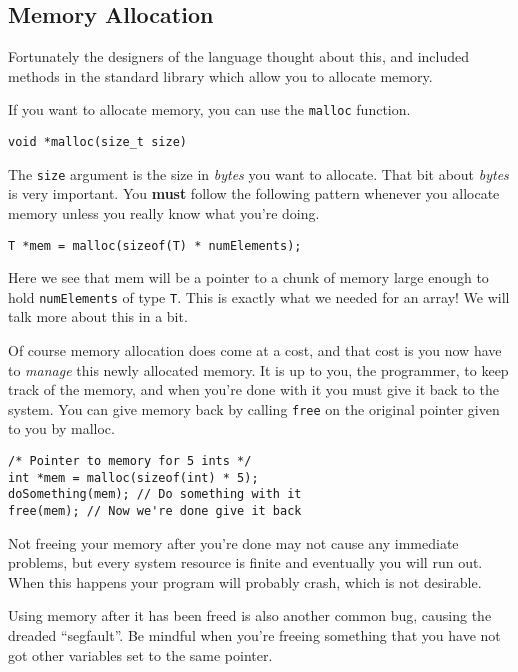 \subsection{Memory Allocation}

Fortunately the designers of the language thought about this, and included methods in the standard library which allow you to allocate memory.

If you want to allocate memory, you can use the \texttt{malloc} function. 

\begin{lstlisting}[numbers=none,frame=none]
void *malloc(size_t size)
\end{lstlisting}

The \texttt{size} argument is the size in \emph{bytes} you want to allocate.
That bit about \emph{bytes} is very important.
You \textbf{must} follow the following pattern whenever you allocate memory unless you really know what you're doing.

\begin{lstlisting}[numbers=none,frame=none]
T *mem = malloc(sizeof(T) * numElements);
\end{lstlisting}

Here we see that mem will be a pointer to a chunk of memory large enough to hold \texttt{numElements} of type \texttt{T}.
This is exactly what we needed for an array!
We will talk more about this in a bit.

Of course memory allocation does come at a cost, and that cost is you now have to \emph{manage} this newly allocated memory.
It is up to you, the programmer, to keep track of the memory, and when you're done with it you must give it back to the system.
You can give memory back by calling \texttt{free} on the original pointer given to you by malloc.

\begin{lstlisting}
/* Pointer to memory for 5 ints */
int *mem = malloc(sizeof(int) * 5);
doSomething(mem); // Do something with it
free(mem); // Now we're done give it back
\end{lstlisting}

Not freeing your memory after you're done may not cause any immediate problems, but every system resource is finite and eventually you will run out.
When this happens your program will probably crash, which is not desirable.

Using memory after it has been freed is also another common bug, causing the dreaded ``segfault''.
Be mindful when you're freeing something that you have not got other variables set to the same pointer.

